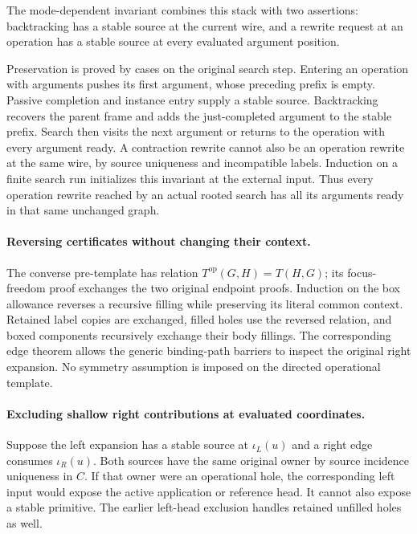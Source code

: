 The mode-dependent invariant combines this stack with two assertions:
backtracking has a stable source at the current wire, and a rewrite request
at an operation has a stable source at every evaluated argument position.

Preservation is proved by cases on the original search step. Entering an
operation with arguments pushes its first argument, whose preceding prefix
is empty. Passive completion and instance entry supply a stable source.
Backtracking recovers the parent frame and adds the just-completed argument
to the stable prefix. Search then visits the next argument or returns to the
operation with every argument ready. A contraction rewrite cannot also be an
operation rewrite at the same wire, by source uniqueness and incompatible
labels. Induction on a finite search run initializes this invariant at the
external input. Thus every operation rewrite reached by an actual rooted
search has all its arguments ready in that same unchanged graph.

\paragraph{Reversing certificates without changing their context.}
The converse pre-template has relation $T^{\mathrm{op}}(G,H)=T(H,G)$;
its focus-freedom proof exchanges the two original endpoint proofs.
Induction on the box allowance reverses a recursive filling while preserving
its literal common context. Retained label copies are exchanged, filled
holes use the reversed relation, and boxed components recursively exchange
their body fillings. The corresponding edge theorem allows the generic
binding-path barriers to inspect the original right expansion. No symmetry
assumption is imposed on the directed operational template.

\paragraph{Excluding shallow right contributions at evaluated coordinates.}
Suppose the left expansion has a stable source at $\iota_L(u)$ and a right
edge consumes $\iota_R(u)$. Both sources have the same original owner by
source incidence uniqueness in $C$. If that owner were an operational hole,
the corresponding left input would expose the active application or reference
head. It cannot also expose a stable primitive. The earlier left-head
exclusion handles retained unfilled holes as well.

